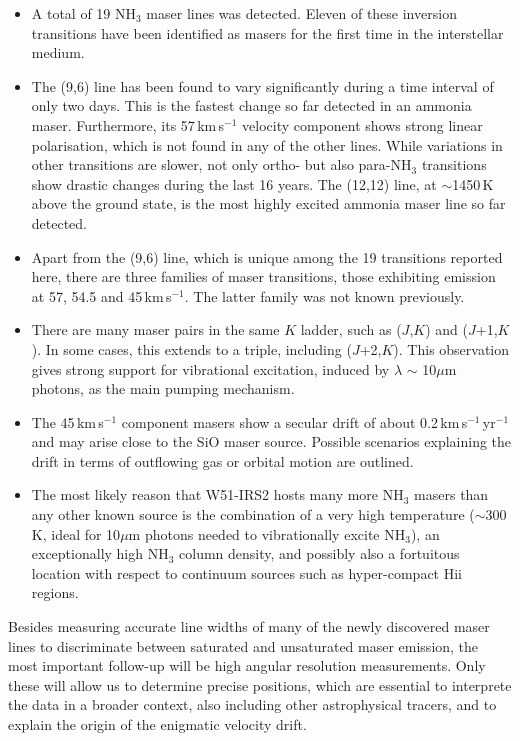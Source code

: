 \documentclass[oldversion]{aa}
\begin{document}
\begin{itemize}

\item A total of 19 NH$_3$ maser lines was detected. Eleven of these
inversion transitions have been identified as masers for the first 
time in the interstellar medium. 

\item The (9,6) line has been found to vary significantly during
a time interval of only two days. This is the fastest change so 
far detected in an ammonia maser. Furthermore, its 57\,km\,s$^{-1}$
velocity component shows strong linear polarisation, which is not
found in any of the other lines. While variations in other transitions 
are slower, not only ortho- but also para-NH$_3$ transitions show
drastic changes during the last 16 years. The (12,12) line,
at $\sim$1450\,K above the ground state, is the most highly excited
ammonia maser line so far detected. 

\item Apart from the (9,6) line, which is unique among 
the 19 transitions reported here, there are three
families of maser transitions, those exhibiting emission at 
57, 54.5 and 45\,km\,s$^{-1}$. The latter family was not known
previously.

\item There are many maser pairs in the same $K$ ladder,
such as ($J$,$K$) and ($J$+1,$K$). In some cases, this extends
to a triple, including ($J$+2,$K$). This observation gives strong
support for vibrational excitation, induced by $\lambda$ 
$\sim$ 10$\mu$m photons, as the main pumping mechanism. 

\item The 45\,km\,s$^{-1}$ component masers show a secular drift
of about 0.2\,km\,s$^{-1}$\,yr$^{-1}$ and may arise close to 
the SiO maser source. Possible scenarios explaining the drift
in terms of outflowing gas or orbital motion are outlined.

\item The most likely reason that W51-IRS2 hosts many more NH$_3$
masers than any other known source is the combination
of a very high temperature ($\sim$300\,K, ideal for 10$\mu$m
photons needed to vibrationally excite NH$_3$), an exceptionally 
high NH$_3$ column density, and possibly also a fortuitous location
with respect to continuum sources such as hyper-compact 
H{\sc ii} regions.

\end{itemize}

Besides measuring accurate line widths of many of the newly
discovered maser lines to discriminate between saturated and
unsaturated maser emission, the most important follow-up 
will be high angular resolution measurements. Only these will
allow us to determine precise positions, which are essential
to interprete the data in a broader context, also including 
other astrophysical tracers, and to explain the origin of the 
enigmatic velocity drift.
\end{document}
